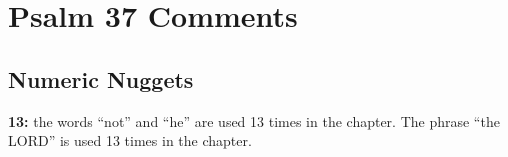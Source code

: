 \section{Psalm 37 Comments}

\subsection{Numeric Nuggets}
\textbf{13: } the words ``not'' and ``he'' are used 13 times in the chapter. The phrase ``the LORD'' is used 13 times in the chapter.